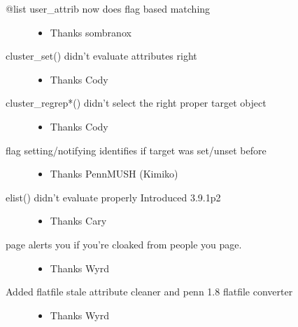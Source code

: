 \documentclass[letterpaper,10pt,english]{sphinxmanual}
\begin{document}
\begin{description}
\begin{itemize}
\end{itemize}

\item[{@list user\_attrib now does flag based matching}] \leavevmode\begin{itemize}
\item {} 
\sphinxAtStartPar
Thanks sombranox

\end{itemize}

\item[{cluster\_set() didn’t evaluate attributes right}] \leavevmode\begin{itemize}
\item {} 
\sphinxAtStartPar
Thanks Cody

\end{itemize}

\item[{cluster\_regrep*() didn’t select the right proper target object}] \leavevmode\begin{itemize}
\item {} 
\sphinxAtStartPar
Thanks Cody

\end{itemize}

\item[{flag setting/notifying identifies if target was set/unset before}] \leavevmode\begin{itemize}
\item {} 
\sphinxAtStartPar
Thanks PennMUSH (Kimiko)

\end{itemize}

\item[{elist() didn’t evaluate properly \sphinxhyphen{} Introduced 3.9.1p2}] \leavevmode\begin{itemize}
\item {} 
\sphinxAtStartPar
Thanks Cary

\end{itemize}

\item[{page alerts you if you’re cloaked from people you page.}] \leavevmode\begin{itemize}
\item {} 
\sphinxAtStartPar
Thanks Wyrd

\end{itemize}

\item[{Added flatfile stale attribute cleaner and penn 1.8 flatfile converter}] \leavevmode\begin{itemize}
\item {} 
\sphinxAtStartPar
Thanks Wyrd


\end{itemize}
\end{description}
\end{document}
